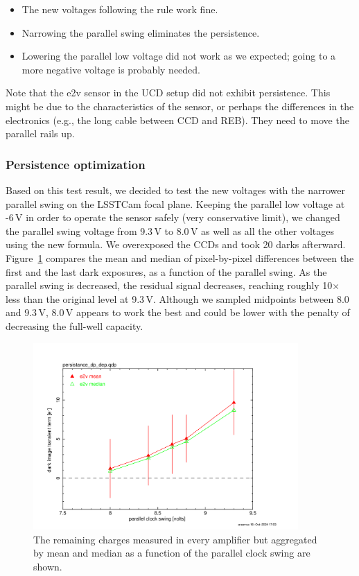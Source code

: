\begin{itemize}
\tightlist
\item
  The new voltages following the rule work fine.
\item
  Narrowing the parallel swing eliminates the persistence.
\item
  Lowering the parallel low voltage did not work
  as we expected; going to a more negative voltage is probably needed.
\end{itemize}

Note that the e2v sensor in the UCD setup did not exhibit persistence.
This might be due to the characteristics of the sensor, or perhaps
the differences in the electronics (e.g., the long cable between CCD and REB). They need to move the parallel rails up.

\subsubsection{Persistence
optimization}\label{persistence-optimization-1}

Based on this test result, we decided to test the new voltages with
the narrower parallel swing on the LSSTCam focal plane. Keeping the
parallel low voltage at -6\,V in order to operate the sensor safely (very
conservative limit), we changed the parallel swing voltage from 9.3\,V to
8.0\,V as well as all the other voltages using the new formula. We
overexposed the CCDs and took 20 darks afterward. Figure~\ref{fig:peristence-swing} compares the
mean and median of pixel-by-pixel differences between the first and the
last dark exposures, as a function of the parallel swing. As the
parallel swing is decreased, the residual signal decreases, reaching
roughly 10$\times$ less than the original level at 9.3\,V. Although we sampled
midpoints between 8.0 and 9.3\,V, 8.0\,V appears to work the best and could
be lower with the penalty of decreasing the full-well capacity.

\begin{figure}
\begin{centering}
\includegraphics[width=0.9\textwidth]{sections/figures/e2v_transient_dark_vs_dp.png}

\caption{The remaining charges measured in every amplifier but
aggregated by mean and median as a function of the parallel clock swing
are shown.}
\label{fig:peristence-swing}
\end{centering}
\end{figure}


